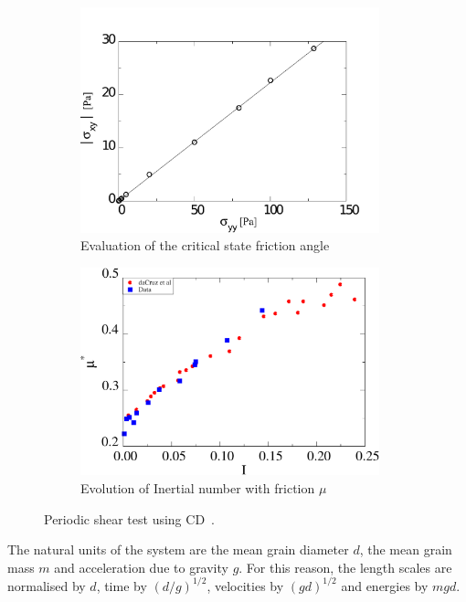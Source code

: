 \begin{figure}[tbhp]
\centering
\begin{subfigure}[t]{0.475\textwidth}
\includegraphics[width=0.95\textwidth]{Sxy_vs_Syy_Slope}
\caption{Evaluation of the critical state friction angle}
\label{fig:Sxy_vs_Syy_Slope}
\end{subfigure}
%
\begin{subfigure}[t]{0.475\textwidth}
\includegraphics[width=0.95\textwidth]{mu_vs_I}
\caption{Evolution of Inertial number with friction $\mu$}
\label{fig:mu_vs_I}
\end{subfigure}
\caption{Periodic shear test using CD~\citep{Mutabaruka2013}.}
\label{fig:Shear_Test_Slope}
\end{figure}

The natural units of the system 
are the mean grain diameter $d$, the mean grain 
mass $m$ and acceleration due to gravity $g$. For this reason, the length 
scales are normalised by $d$, time by $(d/g)^{1/2}$, velocities by $(gd)^{1/2}$ 
and energies by $mgd$. 

